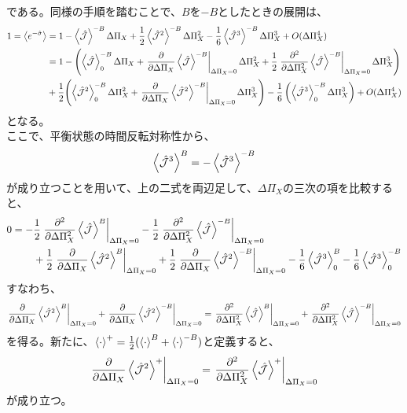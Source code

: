 \documentclass[a4paper,11pt]{jsarticle}
\begin{document}
である。同様の手順を踏むことで、$B$を$-B$としたときの展開は、
\begin{align}
    1=\ev{e^{-\hat{\sigma}}}&= 1-\ev{\hat{\mathcal{J}}}^{-B} \Delta \Pi_X + \frac{1}{2}\ev{\hat{\mathcal{J}}^2}^{-B} \Delta \Pi_X ^2- \frac{1}{6}\ev{\hat{\mathcal{J}}^3}^{-B} \Delta \Pi_X ^3 + O(\Delta \Pi_X ^4)\\
    &=1-\left(\ev{\hat{\mathcal{J}}}^{-B}_0 \Delta \Pi_X + \left.\pdv{\Delta \Pi_X} \ev{\hat{\mathcal{J}}}^{-B}\right|_{\Delta \Pi_X = 0} \Delta \Pi_X ^2 + \frac{1}{2}\left.\pdv[2]{\Delta \Pi_X} \ev{\hat{\mathcal{J}}}^{-B}\right|_{\Delta \Pi_X = 0} \Delta \Pi_X ^3 \right)\\
    &+ \frac{1}{2}\qty(\ev{\hat{\mathcal{J}}^2}^{-B}_0 \Delta \Pi_X ^2 + \left.\pdv{\Delta \Pi_X} \ev{\hat{\mathcal{J}}^2}^{-B}\right|_{\Delta \Pi_X = 0} \Delta \Pi_X ^3)- \frac{1}{6}\left(\ev{\hat{\mathcal{J}}^3}^{-B}_0 \Delta \Pi_X ^3\right) + O(\Delta \Pi_X ^4)
\end{align}
となる。\\
ここで、平衡状態の時間反転対称性から、
\begin{align}
    \ev{\hat{\mathcal{J}}^3}^B = -\ev{\hat{\mathcal{J}}^3}^{-B}
\end{align}
が成り立つことを用いて、上の二式を両辺足して、$\Delta \Pi_X$の三次の項を比較すると、
\begin{align*}
    0=-&\frac{1}{2}\left.\pdv[2]{\Delta \Pi_X} \ev{\hat{\mathcal{J}}}^B\right|_{\Delta \Pi_X = 0} - \frac{1}{2}\left.\pdv[2]{\Delta \Pi_X} \ev{\hat{\mathcal{J}}}^{-B}\right|_{\Delta \Pi_X = 0}\\
    &+\frac{1}{2} \left.\pdv{\Delta \Pi_X} \ev{\hat{\mathcal{J}}^2}^B\right|_{\Delta \Pi_X = 0} + \frac{1}{2}\left.\pdv{\Delta \Pi_X} \ev{\hat{\mathcal{J}}^2}^{-B}\right|_{\Delta \Pi_X = 0} -\frac{1}{6}\ev{\hat{\mathcal{J}}^3}^B_0 - \frac{1}{6}\ev{\hat{\mathcal{J}}^3}^{-B}_0\\
\end{align*}
すなわち、
\begin{align}
    \left.\pdv{\Delta \Pi_X} \ev{\hat{\mathcal{J}}^2}^B\right|_{\Delta \Pi_X = 0} + \left.\pdv{\Delta \Pi_X} \ev{\hat{\mathcal{J}}^2}^{-B}\right|_{\Delta \Pi_X = 0} = \left.\pdv[2]{\Delta \Pi_X} \ev{\hat{\mathcal{J}}}^B\right|_{\Delta \Pi_X = 0} + \left.\pdv[2]{\Delta \Pi_X} \ev{\hat{\mathcal{J}}}^{-B}\right|_{\Delta \Pi_X = 0}
\end{align}
を得る。新たに、$\ev{\cdot}^+ = \frac{1}{2}(\ev{\cdot}^B + \ev{\cdot}^{-B})$と定義すると、
\begin{align}
    \left.\pdv{\Delta \Pi_X} \ev{\hat{\mathcal{J}}^2}^+\right|_{\Delta \Pi_X = 0} = \left.\pdv[2]{\Delta \Pi_X} \ev{\hat{\mathcal{J}}}^+\right|_{\Delta \Pi_X = 0}
\end{align}
が成り立つ。\hfill \qedsymbol\\
\end{document}
